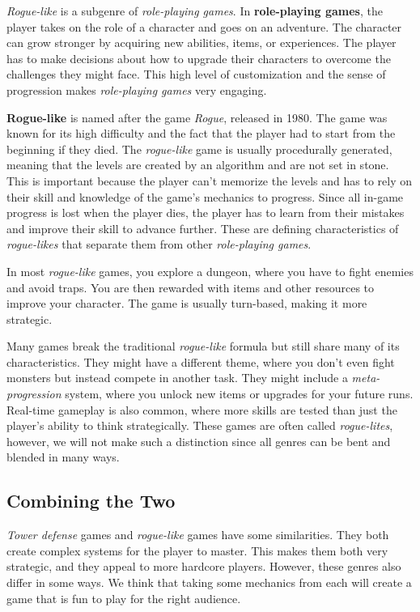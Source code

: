 \emph{Rogue-like} is a subgenre of \emph{role-playing games}.
In \textbf{role-playing games}, the player takes on the role of a character and goes on an adventure.
The character can grow stronger by acquiring new abilities, items, or experiences.
The player has to make decisions about how to upgrade their characters to overcome the challenges they might face.
This high level of customization and the sense of progression makes \emph{role-playing games} very engaging.

\textbf{Rogue-like} is named after the game \emph{Rogue}, released in 1980.
The game was known for its high difficulty and the fact that the player had to start from the beginning if they died.
The \emph{rogue-like} game is usually procedurally generated, meaning that the levels are created by an algorithm and are not set in stone.
This is important because the player can't memorize the levels and has to rely on their skill and knowledge of the game's mechanics to progress.
Since all in-game progress is lost when the player dies, the player has to learn from their mistakes and improve their skill to advance further.
These are defining characteristics of \emph{rogue-likes} that separate them from other \emph{role-playing games}.

In most \emph{rogue-like} games, you explore a dungeon, where you have to fight enemies and avoid traps.
You are then rewarded with items and other resources to improve your character.
The game is usually turn-based, making it more strategic.

Many games break the traditional \emph{rogue-like} formula but still share many of its characteristics.
They might have a different theme, where you don't even fight monsters but instead compete in another task.
They might include a \emph{meta-progression} system, where you unlock new items or upgrades for your future runs.
Real-time gameplay is also common, where more skills are tested than just the player's ability to think strategically.
These games are often called \emph{rogue-lites}, however, we will not make such a distinction since all genres can be bent and blended in many ways.

\subsection{Combining the Two}

\emph{Tower defense} games and \emph{rogue-like} games have some similarities.
They both create complex systems for the player to master.
This makes them both very strategic, and they appeal to more hardcore players.
However, these genres also differ in some ways.
We think that taking some mechanics from each will create a game that is fun to play for the right audience.

